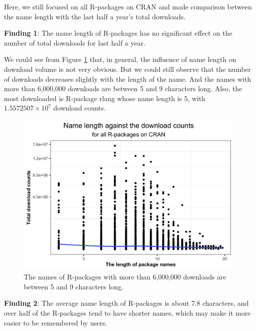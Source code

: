 \documentclass[
]{book}
\newenvironment{discovery}[1]{%
  \begin{tcolorbox}[colback=blue!30,colframe=blue!80!black]#1}{\end{tcolorbox}}
\begin{document}
Here, we still focused on all R-packages on CRAN and made comparison between the name length with the last half a year's total downloads.

\begin{discovery}
\textbf{Finding 1}: The name length of R-packages has no significant
effect on the number of total downloads for last half a year.
\end{discovery}

We could see from Figure \ref{fig:namelength-plot} that, in general, the influence of name length on download volume is not very obvious. But we could still observe that the number of downloads decreases slightly with the length of the name. And the names with more than 6,000,000 downloads are between 5 and 9 characters long. Also, the most downloaded is R-package rlang whose name length is 5, with \ensuremath{1.5572507\times 10^{7}} download counts.



\begin{figure}

{\centering \includegraphics{figures/namelength-plot-1} 

}

\caption{The names of R-packages with more than 6,000,000 downloads are between 5 and 9 characters long.}\label{fig:namelength-plot}
\end{figure}

\begin{discovery}
\textbf{Finding 2}: The average name length of R-packages is about 7.8
characters, and over half of the R-packages tend to have shorter names,
which may make it more easier to be remembered by users.
\end{discovery}
\end{document}
